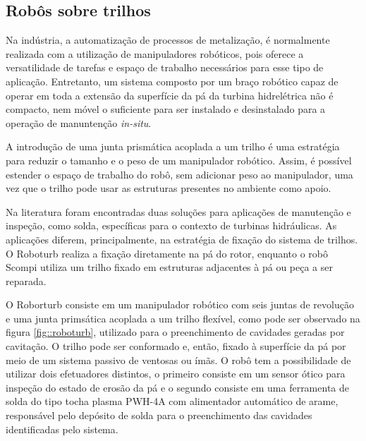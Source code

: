 \subsection{Robôs sobre trilhos}
\label{sec::rail}
Na indústria, a automatização de processos de metalização, é
normalmente realizada com a utilização de manipuladores robóticos, pois oferece
a versatilidade de tarefas e espaço de trabalho necessários para esse
tipo de aplicação. Entretanto, um sistema composto por um braço robótico capaz
de operar em toda a extensão da superfície da pá da turbina hidrelétrica
não é compacto, nem móvel o suficiente para ser instalado e desinstalado para a
operação de manuntenção \textit{in-situ}.

A introdução de uma junta prismática acoplada a um trilho é uma estratégia para
reduzir o tamanho e o peso de um manipulador robótico.  Assim, é possível estender o
 espaço de trabalho do robô, sem adicionar peso ao manipulador, uma vez que o
 trilho pode usar as estruturas presentes no ambiente como apoio. 

Na literatura foram encontradas duas soluções para aplicações de manutenção e
inspeção, como solda, específicas para o contexto de turbinas hidráulicas. As
aplicações diferem, principalmente, na estratégia de fixação do sistema
de trilhos.
O Roboturb \citep{roboturb} realiza a fixação
diretamente na pá do rotor, enquanto o robô Scompi \citep{scompi} utiliza um
trilho fixado em
estruturas adjacentes à pá ou peça a ser reparada.

O Roborturb consiste em um manipulador robótico com seis juntas de revolução e
uma junta primsática acoplada a um trilho flexível, como pode ser observado
na figura \ref{fig::roboturb}, utilizado para o preenchimento de cavidades
geradas por cavitação.
O trilho pode ser conformado e, então, fixado à superfície da pá por meio de um
 sistema passivo de ventosas ou ímãs. O robô tem a possibilidade de utilizar dois 
 efetuadores distintos, o primeiro consiste em um sensor ótico para inspeção do 
 estado de erosão da pá e o segundo consiste em uma ferramenta de solda do 
tipo tocha plasma PWH-4A com alimentador automático de arame, responsável pelo 
depósito de solda para o preenchimento das cavidades identificadas pelo sistema.


